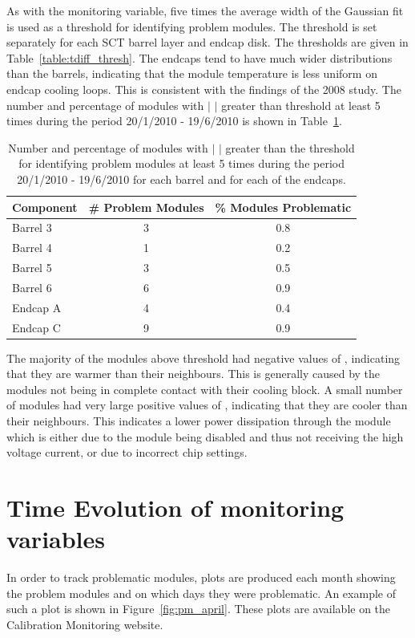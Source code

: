 As with the \deltat monitoring variable, five times the average width of the
Gaussian fit is used as a threshold for identifying problem modules. The
threshold is set separately for each SCT barrel layer and endcap disk. The
thresholds are given in Table~\ref{table:tdiff_thresh}. The endcaps tend to have much wider distributions than the barrels, indicating that the module temperature is less uniform on endcap cooling loops. This is consistent with the findings of the 2008 study. The number and percentage of modules with $|$ \tdiff$|$ greater than threshold at least 5 times during the period 20/1/2010 - 19/6/2010 is shown in Table~\ref{table:tdiff_num}.

\begin{table}
 \centering
\begin{tabular}{ | l | c | c |}
\hline
Component & \# Problem Modules & \% Modules Problematic \\
\hline
Barrel 3 & 3 & 0.8 \\
Barrel 4 & 1 & 0.2 \\
Barrel 5 & 3 & 0.5 \\
Barrel 6 & 6 & 0.9 \\
Endcap A & 4 & 0.4 \\
Endcap C & 9 & 0.9 \\
\hline
 \end{tabular}
\caption{Number and percentage of modules with $|$ \tdiff$|$ greater than the threshold for identifying problem modules at least 5 times during the period 20/1/2010 - 19/6/2010 for each barrel and for each of the endcaps.}
\label{table:tdiff_num}
\end{table}

The majority of the modules above threshold had negative values of \tdiff,
indicating that they are warmer than their neighbours. This is generally caused by the modules not being in complete contact with their cooling block. A small number of modules had very large positive values of \tdiff, indicating that they are cooler than their neighbours. This indicates a lower power dissipation through the module which is either due to the module being disabled and thus not receiving the high voltage current, or due to incorrect chip settings.

\section{Time Evolution of monitoring variables}

In order to track problematic modules, plots are produced each month showing the problem modules and on which days they were problematic. An example of such a plot is shown in Figure~\ref{fig:pm_april}. These plots are available on the Calibration Monitoring website.

